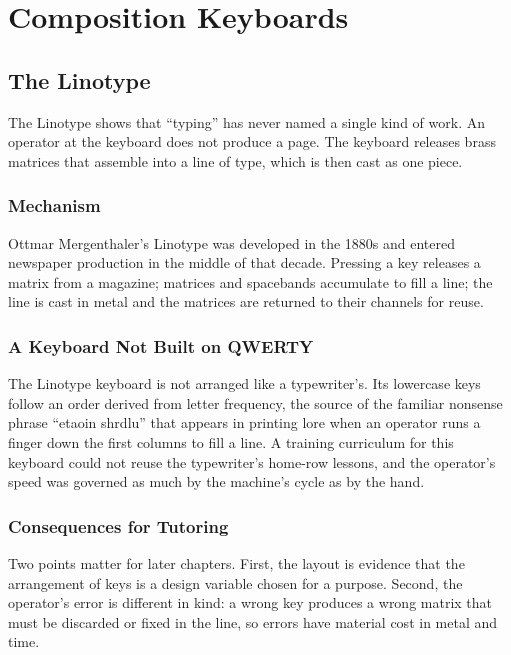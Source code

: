\part{Composition Keyboards}

\chapter{The Linotype}

The Linotype shows that ``typing'' has never named a single kind of work. An operator at the keyboard does not produce a page. The keyboard releases brass matrices that assemble into a line of type, which is then cast as one piece.

\section{Mechanism}

Ottmar Mergenthaler's Linotype was developed in the 1880s and entered newspaper production in the middle of that decade.  Pressing a key releases a matrix from a magazine; matrices and spacebands accumulate to fill a line; the line is cast in metal and the matrices are returned to their channels for reuse.

\section{A Keyboard Not Built on QWERTY}

The Linotype keyboard is not arranged like a typewriter's. Its lowercase keys follow an order derived from letter frequency, the source of the familiar nonsense phrase ``etaoin shrdlu'' that appears in printing lore when an operator runs a finger down the first columns to fill a line.  A training curriculum for this keyboard could not reuse the typewriter's home-row lessons, and the operator's speed was governed as much by the machine's cycle as by the hand.

\section{Consequences for Tutoring}

Two points matter for later chapters. First, the layout is evidence that the arrangement of keys is a design variable chosen for a purpose. Second, the operator's error is different in kind: a wrong key produces a wrong matrix that must be discarded or fixed in the line, so errors have material cost in metal and time.

